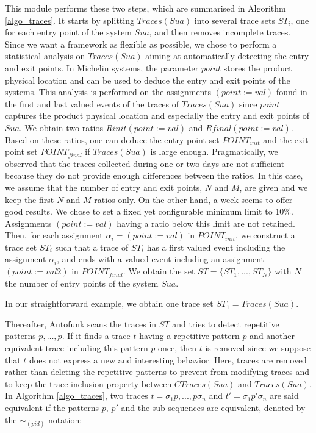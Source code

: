 This module performs these two steps, which are summarised in
Algorithm \ref{algo_traces}. It starts by splitting $Traces(Sua)$
into several trace sets $ST_i$, one for each entry point of the
system $\mathit{Sua}$, and then removes incomplete traces. Since
we want a framework as flexible as possible, we chose to perform
a statistical analysis on $Traces(Sua)$ aiming at automatically
detecting the entry and exit points.  In Michelin systems, the
parameter $point$ stores the product physical location and can be
used to deduce the entry and exit points of the systems.
This analysis is performed on the assignments $(point:=val)$
found in the first and last valued events of the traces of
$Traces(Sua)$ since $point$ captures the product physical
location and especially the entry and exit points of $\mathit{Sua}$.
We obtain two ratios $Rinit(point:=val)$ and
$Rfinal(point:=val)$.  Based on these ratios, one can deduce the
entry point set $POINT_{init}$ and the exit point set
$POINT_{final}$ if $Traces(Sua)$ is large enough. Pragmatically,
we observed that the traces collected during one or two days are
not sufficient because they do not provide enough differences
between the ratios. In this case, we assume that the number of
entry and exit points, $N$ and $M$, are given and we keep the
first $N$ and $M$ ratios only. On the other hand, a week seems to
offer good results. We chose to set a fixed yet configurable
minimum limit to 10\%. Assignments $(point:=val)$ having a ratio
below this limit are not retained. Then, for each assignment
$\alpha_i=(point:=val)$ in $POINT_{init}$, we construct a trace
set $ST_i$ such that a trace of $ST_i$ has a first valued event
including the assignment $\alpha_i$, and ends with a valued event
including an assignment $(point:=val2)$ in $POINT_{final}$. We
obtain the set $ST=\{ST_1,...,ST_N\}$ with $N$ the number of
entry points of the system $\mathit{Sua}$.

In our straightforward example, we obtain one trace set
$ST_1=Traces(Sua)$.

Thereafter, Autofunk scans the traces in $ST$ and tries to detect
repetitive patterns $p,\dots,p$. If it finds a trace $t$ having a
repetitive pattern $p$ and another equivalent trace including
this pattern $p$ once, then $t$ is removed since we suppose that
$t$ does not express a new and interesting behavior. Here, traces
are removed rather than deleting the repetitive patterns to
prevent from modifying traces and to keep the trace inclusion
\cite{petrenko06} property between $CTraces(Sua)$ and
$Traces(Sua)$.  In Algorithm \ref{algo_traces}, two traces
$t=\sigma_1 p,...,p \sigma_n$ and $t'=\sigma_1 p' \sigma_n$ are
said equivalent if the patterns $p$, $p'$ and the sub-sequences
are equivalent, denoted by the $\sim_{(pid)}$ notation:

